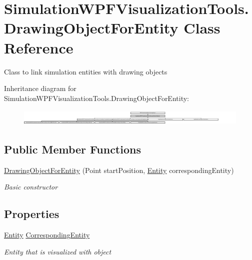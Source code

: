 \hypertarget{class_simulation_w_p_f_visualization_tools_1_1_drawing_object_for_entity}{}\section{Simulation\+W\+P\+F\+Visualization\+Tools.\+Drawing\+Object\+For\+Entity Class Reference}
\label{class_simulation_w_p_f_visualization_tools_1_1_drawing_object_for_entity}


Class to link simulation entities with drawing objects  


Inheritance diagram for Simulation\+W\+P\+F\+Visualization\+Tools.\+Drawing\+Object\+For\+Entity\+:\begin{figure}[H]
\begin{center}
\leavevmode
\includegraphics[height=0.787623cm]{class_simulation_w_p_f_visualization_tools_1_1_drawing_object_for_entity}
\end{center}
\end{figure}
\subsection*{Public Member Functions}
\begin{DoxyCompactItemize}
\item 
\hyperlink{class_simulation_w_p_f_visualization_tools_1_1_drawing_object_for_entity_a820e4e042ba6c37063d25dd8516c281e}{Drawing\+Object\+For\+Entity} (Point start\+Position, \hyperlink{class_simulation_core_1_1_h_c_c_m_elements_1_1_entity}{Entity} corresponding\+Entity)
\begin{DoxyCompactList}\small\item\em Basic constructor \end{DoxyCompactList}\end{DoxyCompactItemize}
\subsection*{Properties}
\begin{DoxyCompactItemize}
\item 
\hyperlink{class_simulation_core_1_1_h_c_c_m_elements_1_1_entity}{Entity} \hyperlink{class_simulation_w_p_f_visualization_tools_1_1_drawing_object_for_entity_a00ac49fe30789caf239102c197f13e07}{Corresponding\+Entity}
\begin{DoxyCompactList}\small\item\em Entity that is visualized with object \end{DoxyCompactList}\end{DoxyCompactItemize}

